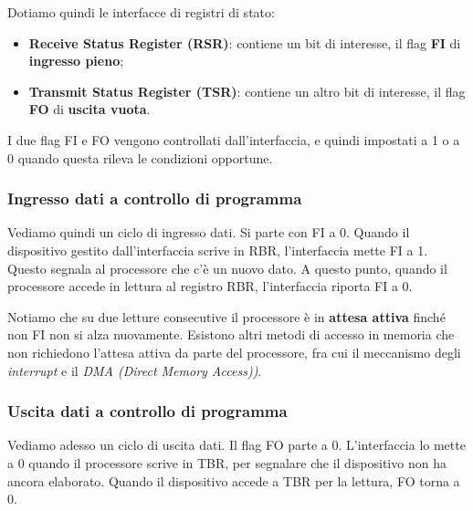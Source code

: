 \documentclass[a4paper,11pt]{article}
\begin{document}
Dotiamo quindi le interfacce di registri di stato:
\begin{itemize}
	\item \textbf{Receive Status Register (RSR)}: contiene un bit di interesse, il flag \textbf{FI} di \textbf{ingresso pieno};
	\item \textbf{Transmit Status Register (TSR)}: contiene un altro bit di interesse, il flag \textbf{FO} di \textbf{uscita vuota}. 
\end{itemize}

I due flag FI e FO vengono controllati dall'interfaccia, e quindi impostati a 1 o a 0 quando questa rileva le condizioni opportune.

\subsubsection{Ingresso dati a controllo di programma}
Vediamo quindi un ciclo di ingresso dati.
Si parte con FI a 0.
Quando il dispositivo gestito dall'interfaccia scrive in RBR, l'interfaccia mette FI a 1. Questo segnala al processore che c'è un nuovo dato.
A questo punto, quando il processore accede in lettura al registro RBR, l'interfaccia riporta FI a 0.

Notiamo che su due letture consecutive il processore è in \textbf{attesa attiva} finché non FI non si alza nuovamente.
Esistono altri metodi di accesso in memoria che non richiedono l'attesa attiva da parte del processore, fra cui il meccanismo degli \textit{interrupt} e il \textit{DMA (Direct Memory Access))}.

\subsubsection{Uscita dati a controllo di programma}
Vediamo adesso un ciclo di uscita dati.
Il flag FO parte a 0.
L'interfaccia lo mette a 0 quando il processore scrive in TBR, per segnalare che il dispositivo non ha ancora elaborato.
Quando il dispositivo accede a TBR per la lettura, FO torna a 0.
\end{document}

